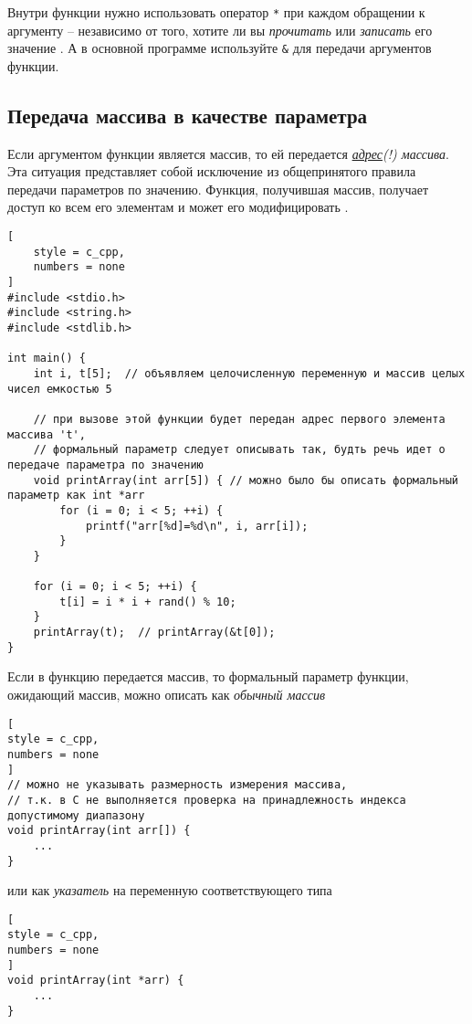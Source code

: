 \documentclass[%
	11pt,
	a4paper,
	utf8,
		]{article}
\begin{document}
Внутри функции нужно использовать оператор \verb|*| при каждом обращении к аргументу -- независимо от того, хотите ли вы \emph{прочитать} или \emph{записать} его значение \cite[]{koltzov-c-lang:2019}. А в основной программе используйте \verb|&| для передачи аргументов функции.

\subsection{Передача массива в качестве параметра}

Если аргументом функции является массив, то ей передается \emph{\underline{адрес}(!) массива}. Эта ситуация представляет собой исключение из общепринятого правила передачи параметров по значению. Функция, получившая массив, получает доступ ко всем его элементам и может его модифицировать \cite[]{koltzov-c-lang:2019}.

\begin{lstlisting}[
    style = c_cpp,
    numbers = none
]
#include <stdio.h>
#include <string.h>
#include <stdlib.h>

int main() {
	int i, t[5];  // объявляем целочисленную переменную и массив целых чисел емкостью 5
	
	// при вызове этой функции будет передан адрес первого элемента массива 't',
	// формальный параметр следует описывать так, будть речь идет о передаче параметра по значению
	void printArray(int arr[5]) { // можно было бы описать формальный параметр как int *arr
		for (i = 0; i < 5; ++i) {
			printf("arr[%d]=%d\n", i, arr[i]);
		}
	}
	
	for (i = 0; i < 5; ++i) {
		t[i] = i * i + rand() % 10;
	}
	printArray(t);  // printArray(&t[0]);
}
\end{lstlisting}

Если в функцию передается массив, то формальный параметр функции, ожидающий массив, можно описать как \emph{обычный массив}
\begin{lstlisting}[
style = c_cpp,
numbers = none
]
// можно не указывать размерность измерения массива,
// т.к. в С не выполняется проверка на принадлежность индекса допустимому диапазону
void printArray(int arr[]) { 
    ...
}
\end{lstlisting}
или как \emph{указатель} на переменную соответствующего типа
\begin{lstlisting}[
style = c_cpp,
numbers = none
]
void printArray(int *arr) {
    ...
}
\end{lstlisting}
\end{document}

